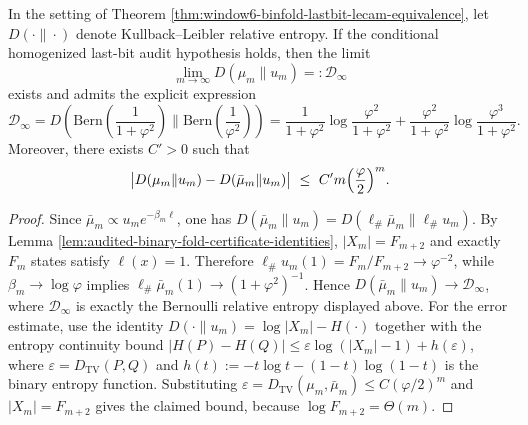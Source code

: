 \begin{corollary}\label{cor:window6-binfold-kl-limit-constant}
In the setting of Theorem \ref{thm:window6-binfold-lastbit-lecam-equivalence}, let \(D(\cdot\|\cdot)\) denote Kullback--Leibler relative entropy.
If the conditional homogenized last-bit audit hypothesis holds, then the limit
\[
\lim_{m\to\infty}D(\mu_m\|u_m)=:\mathcal D_\infty
\]
exists and admits the explicit expression
\[
\mathcal D_\infty
=D\!\left(\mathrm{Bern}\!\left(\frac{1}{1+\varphi^2}\right)\Big\|\mathrm{Bern}\!\left(\frac{1}{\varphi^2}\right)\right)
=\frac{1}{1+\varphi^2}\log\frac{\varphi^2}{1+\varphi^2}
+\frac{\varphi^2}{1+\varphi^2}\log\frac{\varphi^3}{1+\varphi^2}.
\]
Moreover, there exists \(C'>0\) such that
\[
\bigl|D(\mu_m\|u_m)-D(\bar\mu_m\|u_m)\bigr|
\ \le\ C' m\Bigl(\frac{\varphi}{2}\Bigr)^m.
\]
\end{corollary}
\begin{proof}
Since \(\bar\mu_m\propto u_m e^{-\beta_m\ell}\), one has
\(
D(\bar\mu_m\|u_m)=D(\ell_\#\bar\mu_m\|\ell_\#u_m)
\).
By Lemma \ref{lem:audited-binary-fold-certificate-identities}, \(|X_m|=F_{m+2}\) and exactly \(F_m\) states satisfy \(\ell(x)=1\).  Therefore
\(
\ell_\#u_m(1)=F_m/F_{m+2}\to \varphi^{-2}
\),
while \(\beta_m\to\log\varphi\) implies
\(
\ell_\#\bar\mu_m(1)\to (1+\varphi^2)^{-1}
\).
Hence \(D(\bar\mu_m\|u_m)\to \mathcal D_\infty\), where \(\mathcal D_\infty\) is exactly the Bernoulli relative entropy displayed above.
For the error estimate, use the identity
\(
D(\cdot\|u_m)=\log|X_m|-H(\cdot)
\)
together with the entropy continuity bound
\(
|H(P)-H(Q)|\le \varepsilon\log(|X_m|-1)+h(\varepsilon)
\),
where \(\varepsilon=D_{\mathrm{TV}}(P,Q)\) and \(h(t):=-t\log t-(1-t)\log(1-t)\) is the binary entropy function.
Substituting \(\varepsilon=D_{\mathrm{TV}}(\mu_m,\bar\mu_m)\le C(\varphi/2)^m\) and \(|X_m|=F_{m+2}\) gives the claimed bound, because \(\log F_{m+2}=\Theta(m)\). \qedhere
\end{proof}

\endinput
